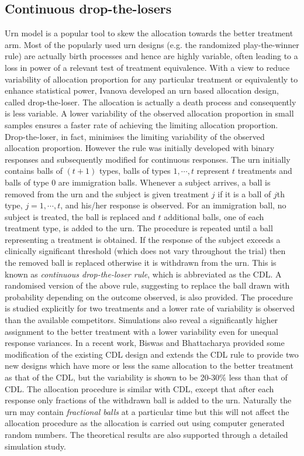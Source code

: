 \subsection{Continuous drop-the-losers}

Urn model is a popular tool to skew the allocation towards the better treatment arm. Most of the popularly used urn designs (e.g. the randomized play-the-winner rule) are actually birth processes and hence are highly variable, often leading to a loss in power of a relevant test of treatment equivalence. With a view to reduce variability of allocation proportion for any particular treatment or equivalently to enhance statistical power, Ivanova\cite{17} developed an urn based allocation design, called drop-the-loser. The allocation is actually a death process and consequently is less variable. A lower variability of the observed allocation proportion in small samples ensures a faster rate of achieving the limiting allocation proportion. Drop-the-loser, in fact, minimises the limiting variability of the observed allocation proportion\cite{69}. However the rule was initially developed
with binary responses and subsequently modified\cite{31} for
continuous responses. The urn initially contains balls of $(t+1)$ types,
balls of types $1,\cdots ,t$ represent $t$ treatments and balls of type 0 are immigration balls. Whenever a subject arrives, a ball is removed from the urn and the subject is given treatment $j$ if it is a ball of $j$th type, $j=1,\cdots ,t$, and his/her response is observed. For an immigration ball, no subject is treated, the ball is replaced and $t$ additional balls, one of each treatment type, is added to the urn. The procedure is repeated until a ball representing a treatment is obtained. If the response of the subject exceeds a clinically significant threshold (which does not vary throughout the trial) then the removed ball is replaced otherwise it is withdrawn from the urn. This is known as \textit{continuous drop-the-loser rule}, which is abbreviated as the CDL. A randomised version of the above rule, suggesting to replace the ball drawn with probability depending on the outcome observed, is also
provided. The procedure is studied explicitly for two treatments and
a lower rate of variability is observed than the available competitors. Simulations also reveal a significantly higher assignment to the better treatment with a lower variability  even for unequal response variances. In a recent work, Biswas and Bhattacharya\cite{32} provided some modification of the existing CDL design and extends the CDL rule to provide two new designs which have more or less the same allocation to the better treatment as that of the CDL, but the variability is shown to be 20-30\% less than that of CDL. The allocation procedure is similar with CDL, except that after each response only fractions of the withdrawn ball is added to the urn. Naturally the urn may contain \textit{fractional balls} at a particular time but this will not affect the allocation procedure as the allocation is carried out using computer generated random numbers. The theoretical results are also supported through a detailed simulation study.

